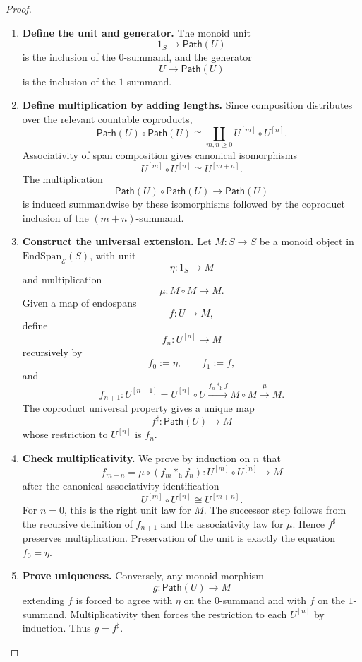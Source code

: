 \begin{proof}
\begin{enumerate}
  \item \textbf{Define the unit and generator.}
  The monoid unit
  \[
    1_S\longrightarrow\mathsf{Path}(U)
  \]
  is the inclusion of the \(0\)-summand, and the generator
  \[
    U\longrightarrow\mathsf{Path}(U)
  \]
  is the inclusion of the \(1\)-summand.

  \item \textbf{Define multiplication by adding lengths.}
  Since composition distributes over the relevant countable coproducts,
  \[
    \mathsf{Path}(U)\circ\mathsf{Path}(U)
    \cong
    \coprod_{m,n\geq 0}U^{[m]}\circ U^{[n]}.
  \]
  Associativity of span composition gives canonical isomorphisms
  \[
    U^{[m]}\circ U^{[n]}
    \cong
    U^{[m+n]}.
  \]
  The multiplication
  \[
    \mathsf{Path}(U)\circ\mathsf{Path}(U)
    \longrightarrow
    \mathsf{Path}(U)
  \]
  is induced summandwise by these isomorphisms followed by the coproduct
  inclusion of the \((m+n)\)-summand.

  \item \textbf{Construct the universal extension.}
  Let \(M:S\to S\) be a monoid object in
  \(\mathrm{EndSpan}_{\mathcal E}(S)\), with unit
  \[
    \eta:1_S\to M
  \]
  and multiplication
  \[
    \mu:M\circ M\to M.
  \]
  Given a map of endospans
  \[
    f:U\longrightarrow M,
  \]
  define
  \[
    f_n:U^{[n]}\longrightarrow M
  \]
  recursively by
  \[
    f_0:=\eta,
    \qquad
    f_1:=f,
  \]
  and
  \[
    f_{n+1}:
    U^{[n+1]}=U^{[n]}\circ U
    \xrightarrow{f_n\ast_{\mathrm h} f}
    M\circ M
    \xrightarrow{\mu}
    M.
  \]
  The coproduct universal property gives a unique map
  \[
    f^\sharp:\mathsf{Path}(U)\longrightarrow M
  \]
  whose restriction to \(U^{[n]}\) is \(f_n\).

  \item \textbf{Check multiplicativity.}
  We prove by induction on \(n\) that
  \[
    f_{m+n}
    =
    \mu\circ(f_m\ast_{\mathrm h} f_n):
    U^{[m]}\circ U^{[n]}\longrightarrow M
  \]
  after the canonical associativity identification
  \[
    U^{[m]}\circ U^{[n]}\cong U^{[m+n]}.
  \]
  For \(n=0\), this is the right unit law for \(M\). The successor step
  follows from the recursive definition of \(f_{n+1}\) and the associativity
  law for \(\mu\). Hence \(f^\sharp\) preserves multiplication. Preservation
  of the unit is exactly the equation \(f_0=\eta\).

  \item \textbf{Prove uniqueness.}
  Conversely, any monoid morphism
  \[
    g:\mathsf{Path}(U)\to M
  \]
  extending \(f\) is forced to agree with \(\eta\) on the \(0\)-summand and
  with \(f\) on the \(1\)-summand. Multiplicativity then forces the
  restriction to each \(U^{[n]}\) by induction. Thus \(g=f^\sharp\).
\end{enumerate}
\end{proof}

